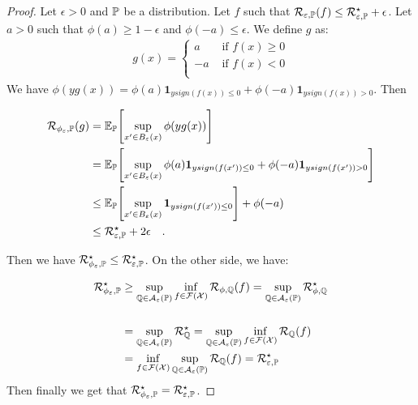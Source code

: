     \begin{proof}
    Let $\epsilon>0$ and $\mathbb{P}$ be a distribution. Let $f$ such that $\mathcal{R}_{\varepsilon,\mathbb{P}}(f) \leq \mathcal{R}_{\varepsilon,\mathbb{P}}^\star +\epsilon$. Let $a>0$ such that $\phi(a)\geq 1-\epsilon$ and $\phi(-a)\leq\epsilon$. We define $g$ as: 
    \begin{align*}
         g(x)= \left\{
        \begin{array}{ll}
        a&\text{ if } f(x)\geq 0\\
        -a&\text{ if } f(x)< 0\\
      \end{array}
      \right.
    \end{align*}
    We have $\phi(yg(x)) = \phi(a) \mathbf{1}_{y sign(f(x))\leq 0}+  \phi(-a) \mathbf{1}_{y sign(f(x))>0}$. Then
    
    \begin{align*}
      \risk_{\phi_\varepsilon,\PP}(g) & = \EE_\PP\left[\sup_{x'\in B_\varepsilon(x)}\phi(yg(x))\right]\\
      & = \EE_\PP\left[\sup_{x'\in B_\varepsilon(x)}\phi(a) \mathbf{1}_{y sign(f(x'))\leq 0}+  \phi(-a) \mathbf{1}_{y sign(f(x'))>0}\right]\\
      &\leq  \EE_\PP\left[\sup_{x'\in B_\varepsilon(x)}\mathbf{1}_{y sign(f(x'))\leq 0}\right]+\phi(-a)\\
      &\leq \risk_{\varepsilon,\PP}^\star + 2\epsilon\quad.
    \end{align*}
    
    Then we have $\mathcal{R}_{\phi_\varepsilon,\mathbb{P}}^\star\leq \mathcal{R}_{\varepsilon,\mathbb{P}}^\star$.
    On the other side, we have: 
    
    \begin{align*}
     \mathcal{R}_{\phi_\varepsilon,\mathbb{P}}^\star & \geq \sup_{\mathbb{Q}\in\mathcal{A}_\varepsilon(\mathbb{P})}  \inf_{f\in\mathcal{F}(\mathcal{X})} \mathcal{R}_{\phi,\mathbb{Q}}(f) = \sup_{\mathbb{Q}\in\mathcal{A}_\varepsilon(\mathbb{P})}  \mathcal{R}_{\phi,\mathbb{Q}}^\star\\
      \\ &= \sup_{\mathbb{Q}\in\mathcal{A}_\varepsilon(\mathbb{P})}  \mathcal{R}_{\mathbb{Q}}^\star= \sup_{\mathbb{Q}\in\mathcal{A}_\varepsilon(\mathbb{P})}\inf_{f\in\mathcal{F}(\mathcal{X})} \mathcal{R}_{\mathbb{Q}}(f)  \\
      & =  \inf_{f\in\mathcal{F}(\mathcal{X})} \sup_{\mathbb{Q}\in\mathcal{A}_\varepsilon(\mathbb{P})}\mathcal{R}_{\mathbb{Q}}(f) = \mathcal{R}_{\varepsilon,\mathbb{P}}^\star \\
    \end{align*}
Then finally we get that $\mathcal{R}_{\phi_\varepsilon,\mathbb{P}}^\star=  \mathcal{R}_{\varepsilon,\mathbb{P}}^\star$.
    
    \end{proof}



